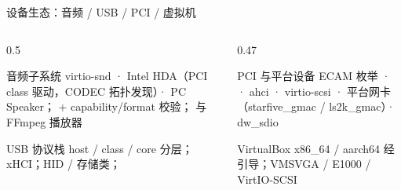 \documentclass[aspectratio=1610]{beamer}
\begin{document}
\begin{frame}{设备生态：音频 / USB / PCI / 虚拟机}
    \begin{columns}[t]
        \begin{column}{0.5\textwidth}
            \begin{block}{音频子系统}
                \footnotesize
                virtio-snd · Intel HDA（PCI class 驱动，CODEC 拓扑发现）· PC Speaker； + capability/format 校验； 与 FFmpeg 播放器
            \end{block}
            \begin{block}{USB 协议栈}
                \footnotesize
                host / class / core 分层；xHCI；HID / 存储类；
            \end{block}
        \end{column}
        \begin{column}{0.47\textwidth}
            \begin{block}{PCI 与平台设备}
                \footnotesize
                ECAM 枚举 ·  · ahci · virtio-scsi · 平台网卡（starfive\_gmac / ls2k\_gmac）· dw\_sdio
            \end{block}
            \begin{block}{VirtualBox}
                \footnotesize
                x86\_64 / aarch64 经  引导；VMSVGA / E1000 / VirtIO-SCSI
            \end{block}
        \end{column}
    \end{columns}
\end{frame}
\end{document}
